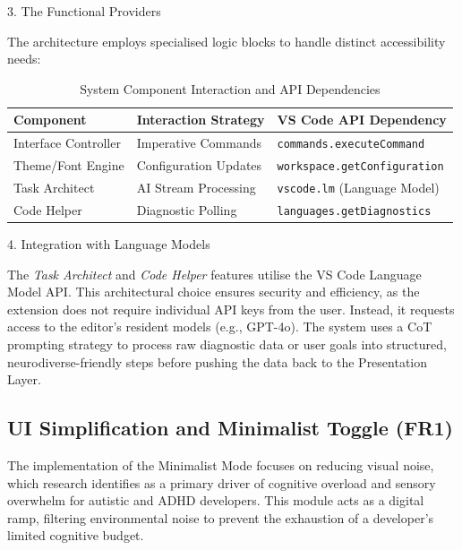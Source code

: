 3. The Functional Providers

The architecture employs specialised logic blocks to handle distinct accessibility needs:

\begin{table}[ht]
    \centering
    \caption{System Component Interaction and \gls{API} Dependencies}\label{tab:system_architecture}
    \small %
    \begin{tabular}{@{} l p{4cm} l @{}}
        \toprule
        \textbf{Component} & \textbf{Interaction Strategy} & \textbf{VS Code API Dependency} \\ 
        \midrule
        Interface Controller & Imperative Commands          & \texttt{commands.executeCommand} \\
        Theme/Font Engine    & Configuration Updates        & \texttt{workspace.getConfiguration} \\
        Task Architect       & \gls{AI} Stream Processing         & \texttt{vscode.lm} (Language Model) \\
        Code Helper          & Diagnostic Polling           & \texttt{languages.getDiagnostics} \\
        \bottomrule
    \end{tabular}
\end{table}

4. Integration with Language Models 

The \textit{Task Architect} and \textit{Code Helper} features utilise the VS Code Language Model \gls{API}. This architectural choice ensures security and efficiency, as the extension does not require individual \gls{API} keys from the user. Instead, it requests access to the editor's resident models (e.g., GPT-4o). The system uses a \gls{CoT} prompting strategy to process raw diagnostic data or user goals into structured, \gls{neurodiverse}-friendly steps before pushing the data back to the Presentation Layer.


\subsection{UI Simplification and Minimalist Toggle (FR1)}
The implementation of the Minimalist Mode focuses on reducing visual noise, which research identifies as a primary driver of cognitive overload and sensory overwhelm for autistic and \gls{ADHD} developers.
 This module acts as a digital ramp, filtering environmental noise to prevent the exhaustion of a developer's limited cognitive budget.
 

